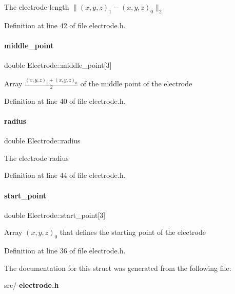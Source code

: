 The electrode length $ \| (x,y,z)_1 - (x,y,z)_0 \|_2 $ 

Definition at line 42 of file electrode.\+h.

\mbox{\label{structElectrode_ae034bc00a274b4f8a7598926a137c501}} 
\paragraph{middle\_point}
{\footnotesize\ttfamily double Electrode\+::middle\+\_\+point[3]}

Array $\frac{(x,y,z)_1 + (x,y,z)_0}{2}$ of the middle point of the electrode 

Definition at line 40 of file electrode.\+h.

\mbox{\label{structElectrode_a624c2d790423334bc9bcc0a7f03380ec}} 
\paragraph{radius}
{\footnotesize\ttfamily double Electrode\+::radius}

The electrode radius 

Definition at line 44 of file electrode.\+h.

\mbox{\label{structElectrode_a13162a47c86c7e71cecf6174033b42ec}} 
\paragraph{start\_point}
{\footnotesize\ttfamily double Electrode\+::start\+\_\+point[3]}

Array $(x,y,z)_0$ that defines the starting point of the electrode 

Definition at line 36 of file electrode.\+h.



The documentation for this struct was generated from the following file\+:\begin{DoxyCompactItemize}
\item 
src/\textbf{ electrode.\+h}\end{DoxyCompactItemize}
